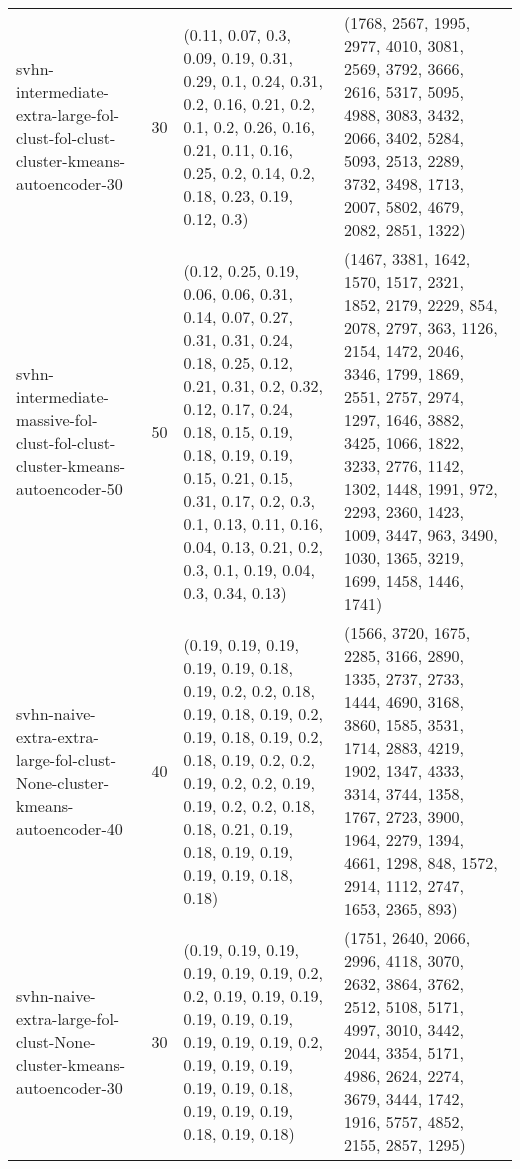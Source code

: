 \begin{longtable}{llll}
                              svhn-intermediate-extra-large-fol-clust-fol-clust-cluster-kmeans-autoencoder-30 &             30 &                                                                                                                               (0.11, 0.07, 0.3, 0.09, 0.19, 0.31, 0.29, 0.1, 0.24, 0.31, 0.2, 0.16, 0.21, 0.2, 0.1, 0.2, 0.26, 0.16, 0.21, 0.11, 0.16, 0.25, 0.2, 0.14, 0.2, 0.18, 0.23, 0.19, 0.12, 0.3) &                                                                                                                      (1768, 2567, 1995, 2977, 4010, 3081, 2569, 3792, 3666, 2616, 5317, 5095, 4988, 3083, 3432, 2066, 3402, 5284, 5093, 2513, 2289, 3732, 3498, 1713, 2007, 5802, 4679, 2082, 2851, 1322) \\
                                  svhn-intermediate-massive-fol-clust-fol-clust-cluster-kmeans-autoencoder-50 &             50 &      (0.12, 0.25, 0.19, 0.06, 0.06, 0.31, 0.14, 0.07, 0.27, 0.31, 0.31, 0.24, 0.18, 0.25, 0.12, 0.21, 0.31, 0.2, 0.32, 0.12, 0.17, 0.24, 0.18, 0.15, 0.19, 0.18, 0.19, 0.19, 0.15, 0.21, 0.15, 0.31, 0.17, 0.2, 0.3, 0.1, 0.13, 0.11, 0.16, 0.04, 0.13, 0.21, 0.2, 0.3, 0.1, 0.19, 0.04, 0.3, 0.34, 0.13) &  (1467, 3381, 1642, 1570, 1517, 2321, 1852, 2179, 2229, 854, 2078, 2797, 363, 1126, 2154, 1472, 2046, 3346, 1799, 1869, 2551, 2757, 2974, 1297, 1646, 3882, 3425, 1066, 1822, 3233, 2776, 1142, 1302, 1448, 1991, 972, 2293, 2360, 1423, 1009, 3447, 963, 3490, 1030, 1365, 3219, 1699, 1458, 1446, 1741) \\
                                    svhn-naive-extra-extra-large-fol-clust-None-cluster-kmeans-autoencoder-40 &             40 &                                                                    (0.19, 0.19, 0.19, 0.19, 0.19, 0.18, 0.19, 0.2, 0.2, 0.18, 0.19, 0.18, 0.19, 0.2, 0.19, 0.18, 0.19, 0.2, 0.18, 0.19, 0.2, 0.2, 0.19, 0.2, 0.2, 0.19, 0.19, 0.2, 0.2, 0.18, 0.18, 0.21, 0.19, 0.18, 0.19, 0.19, 0.19, 0.19, 0.18, 0.18) &                                                            (1566, 3720, 1675, 2285, 3166, 2890, 1335, 2737, 2733, 1444, 4690, 3168, 3860, 1585, 3531, 1714, 2883, 4219, 1902, 1347, 4333, 3314, 3744, 1358, 1767, 2723, 3900, 1964, 2279, 1394, 4661, 1298, 848, 1572, 2914, 1112, 2747, 1653, 2365, 893) \\
                                          svhn-naive-extra-large-fol-clust-None-cluster-kmeans-autoencoder-30 &             30 &                                                                                                                         (0.19, 0.19, 0.19, 0.19, 0.19, 0.19, 0.2, 0.2, 0.19, 0.19, 0.19, 0.19, 0.19, 0.19, 0.19, 0.19, 0.19, 0.2, 0.19, 0.19, 0.19, 0.19, 0.19, 0.18, 0.19, 0.19, 0.19, 0.18, 0.19, 0.18) &                                                                                                                      (1751, 2640, 2066, 2996, 4118, 3070, 2632, 3864, 3762, 2512, 5108, 5171, 4997, 3010, 3442, 2044, 3354, 5171, 4986, 2624, 2274, 3679, 3444, 1742, 1916, 5757, 4852, 2155, 2857, 1295) \\

\end{longtable}
